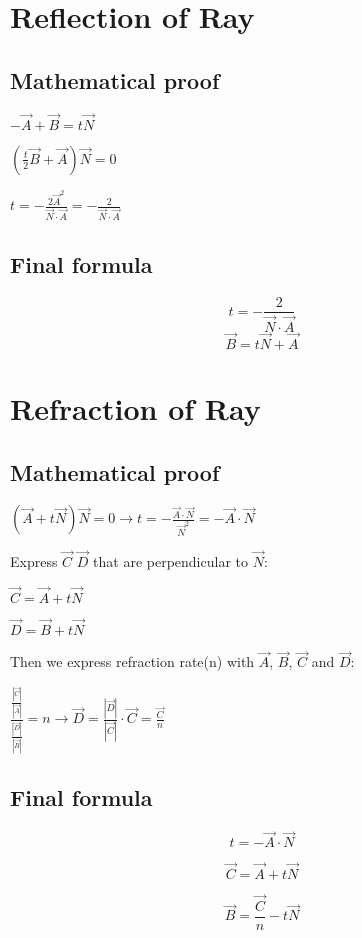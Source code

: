 \documentclass{article}
\begin{document}
\section{Reflection of Ray}
\subsection{Mathematical proof}
$-\vec{A} + \vec{B} = t\vec{N}$

$(\frac{t}{2}\vec{B} + \vec{A})\vec{N} = 0$

$t = -\frac{2\vec{A}^2}{\vec{N} \cdot \vec{A}} = -\frac{2}{\vec{N} \cdot \vec{A}}$

\subsection{Final formula}
\begin{equation}
t = -\frac{2}{\vec{N} \cdot \vec{A}}
\end{equation}
\begin{equation}
\vec{B} = t\vec{N} + \vec{A}
\end{equation}

\section{Refraction of Ray}
\subsection{Mathematical proof}
$
(\vec{A} + t\vec{N})\vec{N} = 0
\rightarrow
t = -\frac{\vec{A} \cdot \vec{N}}{\vec{N}^2}
=
-\vec{A} \cdot \vec{N}
$

Express $\vec{C}$ $\vec{D}$ that are perpendicular to $\vec{N}$:

$\vec{C} = \vec{A} + t\vec{N}$

$\vec{D} = \vec{B} + t\vec{N}$

Then we express refraction rate(n) with $\vec{A}$, $\vec{B}$, $\vec{C}$ and $\vec{D}$:

$
\frac{\frac{|\vec{C}|}{|\vec{A}|}}{\frac{|\vec{D}|}{|\vec{B}|}} = n
\rightarrow
\vec{D} = \frac{|\vec{D}|}{|\vec{C}|} \cdot \vec{C}
=
\frac{\vec{C}}{n}
$

\subsection{Final formula}
\begin{equation}
t = -\vec{A} \cdot \vec{N}
\end{equation}

\begin{equation}
\vec{C} = \vec{A} + t\vec{N}
\end{equation}

\begin{equation}
\vec{B} = \frac{\vec{C}}{n} - t\vec{N}
\end{equation}
\end{document}
